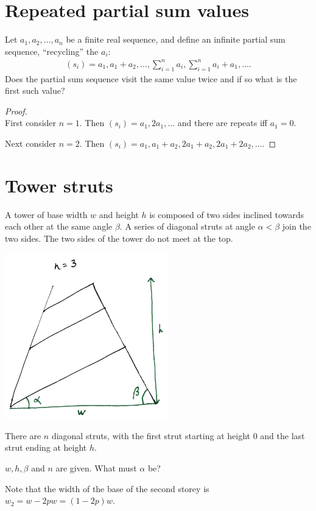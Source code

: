 \documentclass[12pt]{article}
\begin{document}
\section{Repeated partial sum values}

\begin{mdframed}
  Let $a_1, a_2, \ldots, a_n$ be a finite real sequence, and define an infinite partial sum
  sequence, ``recycling'' the $a_i$:
  \begin{align*}
    (s_i) = a_1, a_1 + a_2, \ldots, \sum_{i=1}^na_i, \sum_{i=1}^na_i + a_1, \ldots.
  \end{align*}
  Does the partial sum sequence visit the same value twice and if so what is the first such value?
\end{mdframed}


\begin{proof}~\\
  First consider $n = 1$. Then $(s_i) = a_1, 2a_1, \ldots$ and there are repeats iff $a_1 = 0$.

  Next consider $n = 2$. Then $(s_i) = a_1, a_1 + a_2, 2a_1 + a_2, 2a_1 + 2a_2, \ldots$.
\end{proof}
\section{Tower struts}

\begin{mdframed}
  A tower of base width $w$ and height $h$ is composed of two sides inclined towards each other at
  the same angle $\beta$. A series of diagonal struts at angle $\alpha < \beta$ join the two
  sides. The two sides of the tower do not meet at the top.

  \includegraphics[width=200pt]{img/puzzles-tower-struts.png}

  There are $n$ diagonal struts, with the first strut starting at height 0 and the last strut
  ending at height $h$.

  $w, h, \beta$ and $n$ are given. What must $\alpha$ be?
\end{mdframed}
Note that the width of the base of the second storey is $w_2 = w - 2pw = (1 - 2p)w$.
\end{document}
